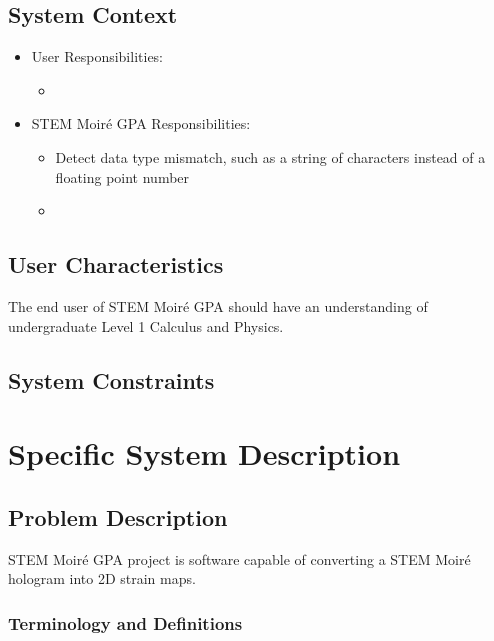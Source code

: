 \documentclass[12pt]{article}
\newcommand{\progname}{STEM Moir{\'e} GPA}
\begin{document}
\subsection{System Context}


\begin{itemize}
\item User Responsibilities:
\begin{itemize}
\item 
\end{itemize}
\item \progname{} Responsibilities:
\begin{itemize}
\item Detect data type mismatch, such as a string of characters instead of a
  floating point number
\item 
\end{itemize}
\end{itemize}

\subsection{User Characteristics} \label{SecUserCharacteristics}

The end user of \progname{} should have an understanding of undergraduate Level
1 Calculus and Physics.

\subsection{System Constraints}


\section{Specific System Description}
\subsection{Problem Description} \label{Sec_pd}

STEM Moir{\'e} GPA project is software capable of converting a STEM Moir{\'e} 
hologram into 2D strain maps.

\subsubsection{Terminology and Definitions}
\end{document}
